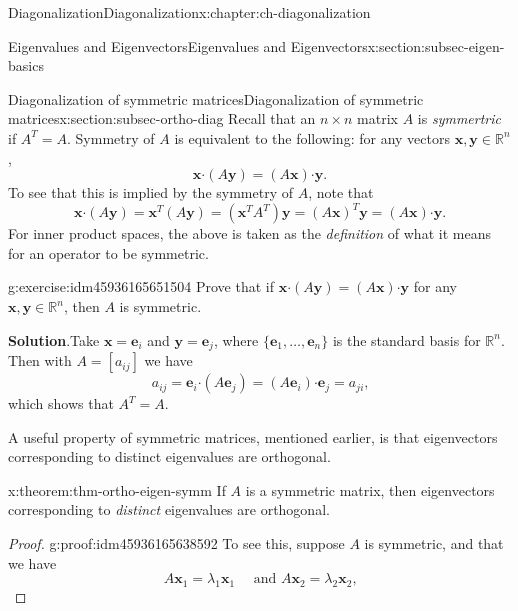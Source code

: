 \documentclass[oneside,10pt,]{book}
\newcommand{\blocktitlefont}{\relax}
\numberwithin{equation}{section}
\newcommand{\R}{\mathbb{R}}
\newcommand{\dotp}{\!\boldsymbol{\cdot}\!}
\newcommand{\xx}{\mathbf{x}}
\newcommand{\yy}{\mathbf{y}}
\begin{document}
\begin{chapterptx}{Diagonalization}{}{Diagonalization}{}{}{x:chapter:ch-diagonalization}
\begin{sectionptx}{Eigenvalues and Eigenvectors}{}{Eigenvalues and Eigenvectors}{}{}{x:section:subsec-eigen-basics}
\end{sectionptx}
%
%
\typeout{************************************************}
\typeout{************************************************}
%
\begin{sectionptx}{Diagonalization of symmetric matrices}{}{Diagonalization of symmetric matrices}{}{}{x:section:subsec-ortho-diag}
Recall that an \(n\times n\) matrix \(A\) is \emph{symmertric} if \(A^T=A\). Symmetry of \(A\) is equivalent to the following: for any vectors \(\xx,\yy\in\R^n\),%
\begin{equation*}
\xx\dotp (A\yy) = (A\xx)\dotp \yy\text{.}
\end{equation*}
To see that this is implied by the symmetry of \(A\), note that%
\begin{equation*}
\xx\dotp (A\yy) = \xx^T(A\yy)=(\xx^TA^T)\yy = (A\xx)^T\yy=(A\xx)\dotp\yy\text{.}
\end{equation*}
For inner product spaces, the above is taken as the \emph{definition} of what it means for an operator to be symmetric.%
\begin{inlineexercise}{}{g:exercise:idm45936165651504}%
Prove that if \(\xx\dotp(A\yy)=(A\xx)\dotp \yy\) for any \(\xx,\yy\in\R^n\), then \(A\) is symmetric.%
\par\smallskip%
\noindent\textbf{\blocktitlefont Solution}.\label{g:solution:idm45936165644688}{}\hypertarget{g:solution:idm45936165644688}{}\quad{}Take \(\xx=\mathbf{e}_i\) and \(\yy=\mathbf{e}_j\), where \(\{\mathbf{e}_1,\ldots, \mathbf{e}_n\}\) is the standard basis for \(\R^n\). Then with \(A = [a_{ij}]\) we have%
\begin{equation*}
a_{ij} =\mathbf{e}_i\dotp(A\mathbf{e}_j) = (A\mathbf{e}_i)\dotp \mathbf{e}_j = a_{ji}\text{,}
\end{equation*}
which shows that \(A^T=A\).%
\end{inlineexercise}%
A useful property of symmetric matrices, mentioned earlier, is that eigenvectors corresponding to distinct eigenvalues are orthogonal.%
\begin{theorem}{}{}{x:theorem:thm-ortho-eigen-symm}%
If \(A\) is a symmetric matrix, then eigenvectors corresponding to \emph{distinct} eigenvalues are orthogonal.%
\end{theorem}
\begin{proof}{}{g:proof:idm45936165638592}
To see this, suppose \(A\) is symmetric, and that we have%
\begin{equation*}
A\xx_1=\lambda_1\xx_1\quad \text{ and } A\xx_2=\lambda_2\xx_2\text{,}

\end{equation*}
\end{proof}
\end{sectionptx}
\end{chapterptx}
\end{document}
